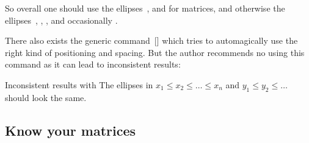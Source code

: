 
So overall one should use the ellipses~,  and  for matrices, and otherwise the ellipses~, , ,  and occasionally .

There also exists the generic command~[\comname] which tries to automagically use the right kind of positioning and spacing.
But the author recommends no using this command as it can lead to inconsistent results:
\begin{showlatex}{Inconsistent results with }
  The ellipses in $x_1 \leq x_2 \leq \dots \leq x_n$ and $y_1 \leq y_2 \leq \dots$ should look the same.
\end{showlatex}




\subsection{Know your matrices}

